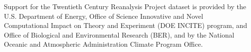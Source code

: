 \documentclass[draft,linenumbers]{agujournal2019}
\begin{document}
%
%
%
%
%
%
%
%


\acknowledgments
Support for the Twentieth Century Reanalysis Project dataset is provided by the U.S. Department of Energy, Office of Science Innovative and Novel Computational Impact on Theory and Experiment (DOE INCITE) program, and Office of Biological and Environmental Research (BER), and by the National Oceanic and Atmospheric Administration Climate Program Office.



%
% 
%








\end{document}
